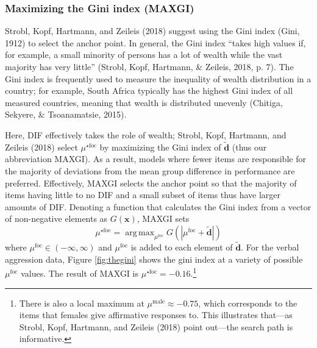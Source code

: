 \documentclass[
  english,
  man,floatsintext]{apa6}
\begin{document}
\hypertarget{maximizing-the-gini-index-maxgi}{%
\subsubsection{Maximizing the Gini index (MAXGI)}\label{maximizing-the-gini-index-maxgi}}

Strobl, Kopf, Hartmann, and Zeileis (2018) suggest using the Gini index (Gini, 1912) to select the anchor point. In general, the Gini index ``takes high values if, for example, a small minority of persons has a lot of wealth while the vast majority has very little'' (Strobl, Kopf, Hartmann, \& Zeileis, 2018, p. 7). The Gini index is frequently used to measure the inequality of wealth distribution in a country; for example, South Africa typically has the highest Gini index of all measured countries, meaning that wealth is distributed unevenly (Chitiga, Sekyere, \& Tsoanamatsie, 2015).

Here, DIF effectively takes the role of wealth; Strobl, Kopf, Hartmann, and Zeileis (2018) select \(\mu^{\star\text{foc}}\) by maximizing the Gini index of \(\tilde{\mathbf{d}}\) (thus our abbreviation MAXGI). As a result, models where fewer items are responsible for the majority of deviations from the mean group difference in performance are preferred. Effectively, MAXGI selects the anchor point so that the majority of items having little to no DIF and a small subset of items thus have larger amounts of DIF. Denoting a function that calculates the Gini index from a vector of non-negative elements as \(G(\mathbf{x})\), MAXGI sets
\begin{equation}
\mu^{\star\text{foc}} = \mathop{\mathrm{arg\,max}}_{\mu^\text{foc}} G(|\mu^\text{foc} + \tilde{\mathbf{d}}|)
\end{equation}
where \(\mu^\text{foc} \in (-\infty, \infty)\) and \(\mu^\text{foc}\) is added to each element of \(\tilde{\mathbf{d}}\). For the verbal aggression data, Figure \ref{fig:thegini} shows the gini index at a variety of possible \(\mu^\text{foc}\) values. The result of MAXGI is \(\mu^{\star\text{foc}} = -0.16\).\footnote{There is also a local maximum at \(\mu^{\text{male}} \approx -0.75\), which corresponds to the items that females give affirmative responses to. This illustrates that---as Strobl, Kopf, Hartmann, and Zeileis (2018) point out---the search path is informative.}
\end{document}
